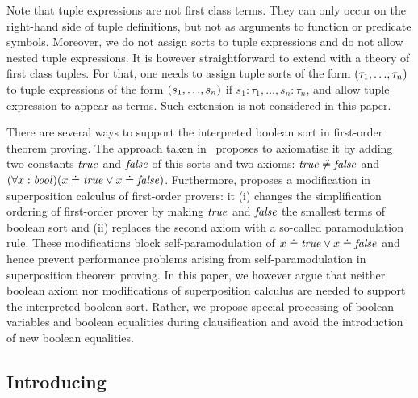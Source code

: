 Note that tuple expressions are not first class terms. They can only occur on the right-hand side of tuple definitions, but not as arguments to function or predicate symbols. Moreover, we do not assign sorts to tuple expressions and do not allow nested tuple expressions. It is however straightforward to extend \folb{} with a theory of first class tuples. For that, one needs to assign tuple sorts of the form $({\tau_1},{\ldots},{\tau_n})$ to tuple expressions of the form $({s_1},{\ldots},{s_n})$ if $s_1:\tau_1,\ldots,s_n:\tau_n$, and allow tuple expression to appear as terms. Such extension is not considered in this paper.

There are several ways to support the interpreted boolean sort in first-order theorem proving. 
The approach taken in~\cite{FOOL} proposes to axiomatise it by adding two constants $\mathit{true}$ and $\mathit{false}$ of this sorts and two axioms: $\mathit{true} \not\doteq \mathit{false}$ and $(\forall x:\mathit{bool})(x \doteq \mathit{true} \lor x \doteq \mathit{false})$. Furthermore, \cite{FOOL} proposes a modification in superposition calculus of first-order provers: it (i)
changes the  simplification ordering of first-order prover by making $\mathit{true}$ and $\mathit{false}$ the smallest terms of boolean sort 
and (ii) replaces the second axiom with a so-called \folb{} paramodulation rule. These modifications block self-paramodulation of $x \doteq \mathit{true} \lor x \doteq \mathit{false}$ and hence prevent performance problems arising from self-paramodulation in superposition theorem proving. 
In this paper, we however argue that neither boolean axiom nor modifications of superposition calculus are needed to support the interpreted boolean sort. 
Rather, we propose special processing of boolean variables and boolean equalities during clausification and avoid the introduction of new boolean equalities. 

\subsection{Introducing \nfcnf{}}

